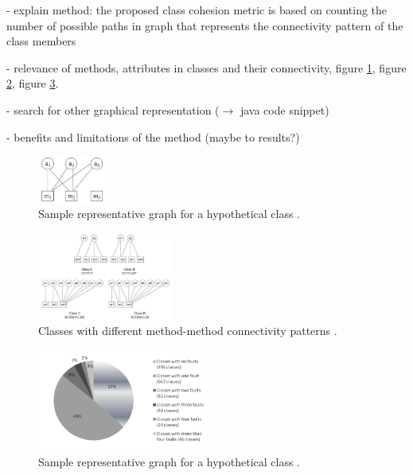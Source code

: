 - explain method: the proposed class cohesion metric is based on counting the number of possible paths in graph that represents the connectivity pattern of the class members

- relevance of methods, attributes in classes and their connectivity, figure \ref{fig1}, figure \ref{fig2}, figure \ref{fig3}.

- search for other graphical representation ($\rightarrow$ java code snippet)

- benefits and limitations of the method (maybe to results?)


\begin{figure}[htbp]
	\centerline{\includegraphics[width=0.2\textwidth]{pictures/am.png}}
	\caption{Sample representative graph for a hypothetical class \cite{b3al2012fault}.}
	\label{fig1}
\end{figure}

\begin{figure}[htbp]
	\centerline{\includegraphics[width=0.4\textwidth]{pictures/am2.png}}
	\caption{Classes with different method-method connectivity patterns \cite{b3al2012fault}.}
	\label{fig2}
\end{figure}

\begin{figure}[htbp]
	\centerline{\includegraphics[width=0.5\textwidth]{pictures/circle.png}}
	\caption{Sample representative graph for a hypothetical class \cite{b3al2012fault}.}
	\label{fig3}
\end{figure}



